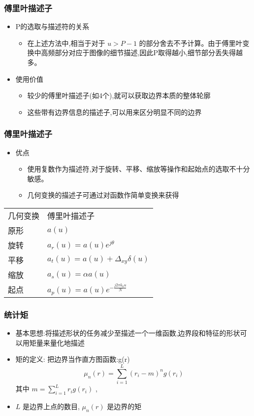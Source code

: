 \documentclass{beamer}
\begin{document}
\begin{frame}
\frametitle{傅里叶描述子}
\label{sec-3-7}

\begin{itemize}
\item P的选取与描述符的关系
\begin{itemize}
\item 在上述方法中,相当于对于 $u>P-1$ 的部分舍去不予计算。由于傅里叶变换中高频部分对应于图像的细节描述,因此P取得越小,细节部分丢失得越多。
\end{itemize}
\item 使用价值
\begin{itemize}
\item 较少的傅里叶描述子(如4个),就可以获取边界本质的整体轮廓
\item 这些带有边界信息的描述子,可以用来区分明显不同的边界
\end{itemize}
\end{itemize}
\end{frame}
\begin{frame}
\frametitle{傅里叶描述子}
\label{sec-3-8}

\begin{itemize}
\item 优点
\begin{itemize}
\item 使用复数作为描述符,对于旋转、平移、缩放等操作和起始点的选取不十分敏感。
\item 几何变换的描述子可通过对函数作简单变换来获得
\end{itemize}
\end{itemize}

\begin{center}
\begin{tabular}{ll}
 几何变换  &  傅里叶描述子                               \\
 原形      &  $a(u)$                                     \\
 旋转      &  $a_r(u) = a(u) e^{j\theta}$                \\
 平移      &  $a_t(u) = a(u) + \Delta_{xy}\delta(u)$     \\
 缩放      &  $a_s(u) = \alpha a(u)$                     \\
 起点      &  $a_p(u) = a(u) e^{-\frac{j2\pi k_0u}{N}}$  \\
\end{tabular}
\end{center}
\end{frame}
\begin{frame}
\frametitle{统计矩}
\label{sec-3-9}

\begin{itemize}
\item 基本思想:将描述形状的任务减少至描述一个一维函数,边界段和特征的形状可以用矩量来量化地描述
\item 矩的定义: 把边界当作直方图函数:g(r)
     \[\mu_n(r) = \sum_{i=1}^L(r_i-m)^ng(r_i)\]
    其中 
       $m=\sum_{i=1}^L r_i g(r_i)$ ,
\item $L$ 是边界上点的数目, $\mu_n(r)$ 是边界的矩
\end{itemize}
\end{frame}
\end{document}
